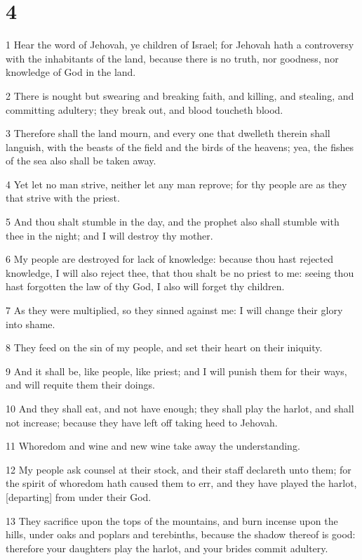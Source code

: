 \chapter{4}

\par 1 Hear the word of Jehovah, ye children of Israel; for Jehovah hath a controversy with the inhabitants of the land, because there is no truth, nor goodness, nor knowledge of God in the land.
\par 2 There is nought but swearing and breaking faith, and killing, and stealing, and committing adultery; they break out, and blood toucheth blood.
\par 3 Therefore shall the land mourn, and every one that dwelleth therein shall languish, with the beasts of the field and the birds of the heavens; yea, the fishes of the sea also shall be taken away.
\par 4 Yet let no man strive, neither let any man reprove; for thy people are as they that strive with the priest.
\par 5 And thou shalt stumble in the day, and the prophet also shall stumble with thee in the night; and I will destroy thy mother.
\par 6 My people are destroyed for lack of knowledge: because thou hast rejected knowledge, I will also reject thee, that thou shalt be no priest to me: seeing thou hast forgotten the law of thy God, I also will forget thy children.
\par 7 As they were multiplied, so they sinned against me: I will change their glory into shame.
\par 8 They feed on the sin of my people, and set their heart on their iniquity.
\par 9 And it shall be, like people, like priest; and I will punish them for their ways, and will requite them their doings.
\par 10 And they shall eat, and not have enough; they shall play the harlot, and shall not increase; because they have left off taking heed to Jehovah.
\par 11 Whoredom and wine and new wine take away the understanding.
\par 12 My people ask counsel at their stock, and their staff declareth unto them; for the spirit of whoredom hath caused them to err, and they have played the harlot, [departing] from under their God.
\par 13 They sacrifice upon the tops of the mountains, and burn incense upon the hills, under oaks and poplars and terebinths, because the shadow thereof is good: therefore your daughters play the harlot, and your brides commit adultery.
